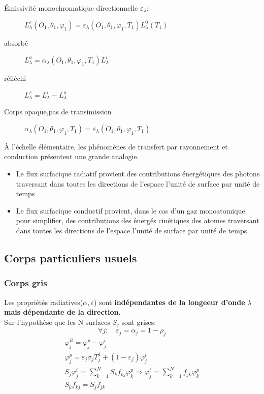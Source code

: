 \documentclass{article}
\begin{document}
\begin{description}
\item [\'Emissivit\'e monochromatique directionnelle $\varepsilon_{\lambda}$:] $L_{\lambda }^e(O_1,\theta_1,\varphi_1) = \varepsilon_{\lambda }(O_1,\theta_1,\varphi_1,T_1)L_{\lambda }^0(T_1)$
\item [absorb\'e]  $L_{\lambda}^a =\alpha_{\lambda }(O_1,\theta_1,\varphi_1,T_1)L_{\lambda}^i $
\item [r\'efl\'echi]  $L_{\lambda}^r = L_{\lambda}^i - L_{\lambda}^a$
\item [Corps opaque,pas de transimission] $\alpha_{\lambda }(O_1,\theta_1,\varphi_1,T_1)=\varepsilon_{\lambda }(O_1,\theta_1,\varphi_1,T_1)$
\end{description}

\bigskip
\`A l'\'echelle \'el\'ementaire, les ph\'enom\`enes de transfert par rayonnement et conduction pr\'esentent une grande analogie.
\begin{itemize}
\item Le flux surfacique radiatif provient des contributions \'energ\'etiques des photons traversant dans toutes les directions de l'espace l'unit\'e de surface par unit\'e de temps
\item Le flux surfacique conductif provient, dans le cas d'un gaz monoatomique pour simplifier, des contributions des \'energ\'es cin\'etiques des atomes traversant dans toutes les directions de l'espace l'unit\'e de surface par unit\'e de temps
\end{itemize}

\subsection{Corps particuliers usuels}
\subsubsection{Corps gris}
Les propri\'et\'es radiatives($\alpha,\varepsilon$) sont \textbf{ind\'ependantes de la longeeur d'onde} $\lambda $ \textbf{mais d\'ependante de la direction}.\\
Sur l'hypoth\`ese que les N surfaces $S_j$ sont grises:
$$\forall j: \quad \varepsilon_j =\alpha_j = 1- \rho_j$$
\begin{eqnarray}
\varphi_j^R=\varphi_j^p - \varphi_j^i \\
\varphi_j^p = \varepsilon_j \sigma_j T_j^4 +(1-\varepsilon_j)\varphi_j^i\\
S_j \varphi_j^i = \sum_{k=1}^N S_k f_{kj}\varphi_k^p \Rightarrow \varphi_j^i = \sum_{k=1}^N f_{jk}\varphi_k^p\\
S_k f_{kj}=S_j f_{jk}
\end{eqnarray}
\end{document}
